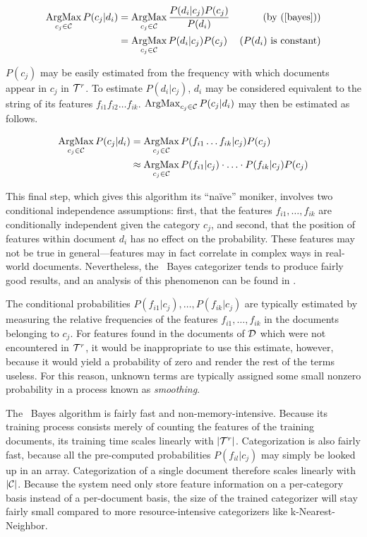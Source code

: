 \begin{align*}
\operatorname*{ArgMax}_{c_j\in\mathcal{C}} P(c_j|d_i) 
 & = \operatorname*{ArgMax}_{c_j\in\mathcal{C}} \frac{P(d_i|c_j) P(c_j)}{P(d_i)} & (\text{by (\ref{bayes})}) \\
 & = \operatorname*{ArgMax}_{c_j\in\mathcal{C}} P(d_i|c_j) P(c_j) & (P(d_i) \text{ is constant}) \\
\end{align*}

$P(c_j)$ may be easily estimated from the frequency with which
documents appear in $c_j$ in $\mathcal{T}^r$.  To estimate $P(d_i|c_j)$,
$d_i$ may be considered equivalent to the string of its features
$f_{i1} f_{i2} \ldots f_{ik}$.  $\operatorname*{ArgMax}_{c_j\in\mathcal{C}} P(c_j|d_i)$ may
then be estimated as follows.

\begin{align*}
\operatorname*{ArgMax}_{c_j\in\mathcal{C}} P(c_j|d_i) 
 & = \operatorname*{ArgMax}_{c_j\in\mathcal{C}} P(f_{i1} \ldots f_{ik}|c_j) P(c_j) \\
 & \approx \operatorname*{ArgMax}_{c_j\in\mathcal{C}} P(f_{i1}|c_j) \cdot \ldots \cdot P(f_{ik}|c_j) P(c_j) \\
\end{align*}

This final step, which gives this algorithm its ``na\"ive'' moniker,
involves two conditional independence assumptions: first, that the
features $f_{i1}, \ldots, f_{ik}$ are conditionally independent given
the category $c_j$, and second, that the position of features within
document $d_i$ has no effect on the probability.  These features may
not be true in general---features may in fact correlate in complex
ways in real-world documents.  Nevertheless, the \naive\ Bayes
categorizer tends to produce fairly good results, and an analysis of
this phenomenon can be found in \cite{domingos:97}.

The conditional probabilities $P(f_{i1}|c_j), \ldots, P(f_{ik}|c_j)$
are typically estimated by measuring the relative frequencies of the
features $f_{i1}, \ldots, f_{ik}$ in the documents belonging to
$c_j$.  For features found in the documents of $\mathcal{D}$ which were not
encountered in $\mathcal{T}^r$, it would be inappropriate to use this
estimate, however, because it would yield a probability of zero and
render the rest of the terms useless.  For this reason, unknown terms
are typically assigned some small nonzero probability in a process
known as \emph{smoothing}.

The \naive\ Bayes algorithm is fairly fast and non-memory-intensive.
Because its training process consists merely of counting the features
of the training documents, its training time scales linearly with
$|\mathcal{T}^r|$.  Categorization is also fairly fast, because all the
pre-computed probabilities $P(f_{il}|c_j)$ may simply be looked up in
an array.  Categorization of a single document therefore scales
linearly with $|\mathcal{C}|$.  Because the system need only store feature
information on a per-category basis instead of a per-document basis,
the size of the trained categorizer will stay fairly small compared to
more resource-intensive categorizers like k-Nearest-Neighbor.

